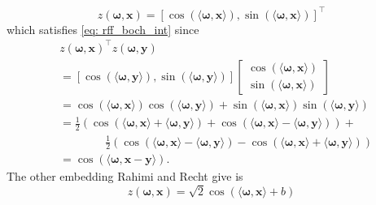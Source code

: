 \begin{equation} \label{eq: rff_emb}
    z \left( \bm{\omega}, \bm{x} \right) = \left[ \cos \left( \langle \bm{\omega} , \bm{x} \rangle \right) , \sin \left( \langle \bm{\omega} , \bm{x} \rangle \right) \right]^{\intercal}
\end{equation}
which satisfies \ref{eq: rff_boch_int} since
\begin{align*}
     & z \left( \bm{\omega}, \bm{x} \right)^{\intercal} z \left( \bm{\omega}, \bm{y} \right)                                                                                                                                                      \\
     & =
    \left[ \cos \left( \langle \bm{\omega} , \bm{y} \rangle \right), \sin \left( \langle \bm{\omega} , \bm{y} \rangle \right)  \right]
    \begin{bmatrix}
        \cos \left( \langle \bm{\omega} , \bm{x} \rangle \right) \\ \sin \left( \langle \bm{\omega} , \bm{x} \rangle \right)
    \end{bmatrix}                                                                                                                                                                                                                     \\
     & = \cos \left( \langle \bm{\omega} , \bm{x} \rangle \right) \cos \left( \langle \bm{\omega} , \bm{y} \rangle \right) + \sin \left( \langle \bm{\omega} , \bm{x} \rangle \right) \sin \left( \langle \bm{\omega} , \bm{y} \rangle \right)    \\
     & = \frac{1}{2} \left( \cos \left( \langle \bm{\omega} , \bm{x} \rangle + \langle \bm{\omega} , \bm{y} \rangle \right) + \cos \left( \langle \bm{\omega} , \bm{x} \rangle - \langle \bm{\omega} , \bm{y} \rangle \right) \right) +           \\
     & \qquad \qquad \frac{1}{2} \left( \cos \left( \langle \bm{\omega} , \bm{x} \rangle - \langle \bm{\omega} , \bm{y} \rangle \right) - \cos \left( \langle \bm{\omega} , \bm{x} \rangle + \langle \bm{\omega} , \bm{y} \rangle \right) \right) \\
     & = \cos \left( \langle \bm{\omega} , \bm{x} - \bm{y} \rangle \right).
\end{align*}
The other embedding Rahimi and Recht give is
\begin{equation} \label{eq: rff_emb_alt}
    z \left( \bm{\omega}, \bm{x} \right) = \sqrt{2} \cos \left(  \langle \bm{\omega} , \bm{x} \rangle + b \right)
\end{equation}
